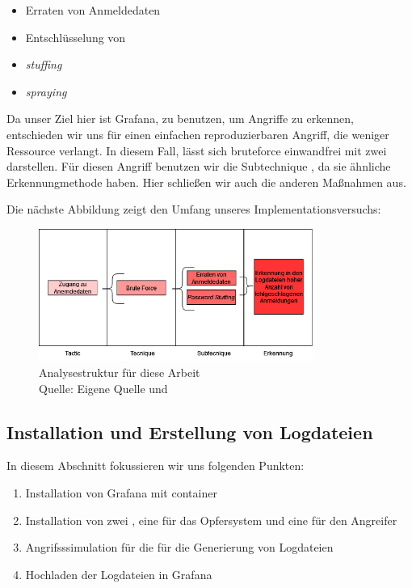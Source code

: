 \begin{itemize}[noitemsep]
   \item Erraten von Anmeldedaten 
   \item	Entschlüsselung von 
   \item \textit{\gls{stuffing}}
   \item \textit{\gls{spraying}}

\end{itemize}

Da unser Ziel hier ist Grafana, zu benutzen, um Angriffe zu erkennen, entschieden wir uns für einen einfachen reproduzierbaren Angriff, die weniger Ressource verlangt. In diesem Fall, lässt sich \gls{bruteforce} einwandfrei mit zwei  darstellen. Für diesen Angriff benutzen wir die Subtechnique , da sie ähnliche Erkennungmethode haben. Hier schließen wir auch die anderen Maßnahmen aus.

Die nächste Abbildung zeigt den Umfang unseres Implementationsversuchs:

\begin{figure}[H]
   \centering
   \includegraphics[width=0.8\textwidth]{assets/T1110.drawio.png}
   \caption{Analysestruktur für diese Arbeit  \\Quelle: Eigene Quelle und \citep{Mitre_t1110}}
   \centering
\end{figure}

\subsection{Installation und Erstellung von Logdateien}

In diesem Abschnitt fokussieren wir uns folgenden Punkten:

\begin{enumerate}[noitemsep]
   \item Installation von Grafana mit \gls{container}
   \item	Installation von zwei , eine für das Opfersystem und eine für den Angreifer
   \item	Angrifsssimulation für die für die Generierung von Logdateien
   \item Hochladen der Logdateien in Grafana
\end{enumerate}

